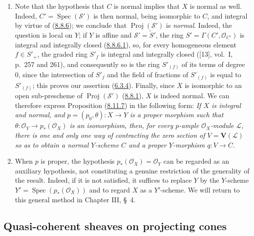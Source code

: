 \begin{remark}[8.11.8]
\label{II.8.11.8}
\begin{enumerate}
  \item[\rm{(i)}] Note that the hypothesis that $C$ is normal implies that
  $X$ is normal as well. Indeed, $C'=\operatorname{Spec}(\mathcal{S}')$ is
  then normal, being isomorphic to $C$, and integral by virtue of
  (\hyperref[II.8.8.6]{8.8.6}); we conclude that
  $\operatorname{Proj}(\mathcal{S}')$ is \emph{normal}. Indeed, the question
  is local on $Y$; if $Y$ is affine and $\mathcal{S}'=\widetilde{S}'$,
  the ring $S'=\Gamma(C',\mathcal{O}_{C'})$ is integral and integrally closed
  (\hyperref[II.8.8.6.1]{8.8.6.1}), so, for every homogeneous element
  $f\in S'_+$, the graded ring $S'_f$ is integral and integrally closed
  ([13], vol.~I, p.~257 and 261), and consequently so is the ring $S'_{(f)}$
  of its terms of degree 0, since the intersection of $S'_f$ and the field
  of fractions of $S'_{(f)}$ is equal to $S'_{(f)}$; this proves our
  assertion (\hyperref[II.6.3.4]{6.3.4}). Finally, since $X$ is isomorphic
  to an open sub-prescheme of $\operatorname{Proj}(\mathcal{S}')$
  (\hyperref[II.8.8.1]{8.8.1}), $X$ is indeed normal. We can therefore
  express Proposition (\hyperref[II.8.11.7]{8.11.7}) in the following form:
  \emph{If $X$ is integral and normal, and
  $p=(p_0,\theta):X\to Y$ is a proper morphism such that
  $\theta:\mathcal{O}_Y\to p_*(\mathcal{O}_X)$ is an isomorphism, then,
  for every $p$-ample $\mathcal{O}_X$-module $\mathcal{L}$, there is one
  and only one way of contracting the zero section of
  $V=\mathbf{V}(\mathcal{L})$ so as to obtain a normal $Y$-scheme $C$ and
  a proper $Y$-morphism $q:V\to C$.}
  \item[\rm{(ii)}] When $p$ is proper, the hypothesis
  $p_*(\mathcal{O}_X)=\mathcal{O}_Y$ can be regarded as an auxiliary
  hypothesis, not constituting a genuine restriction of the generality of the
  result. Indeed, if it is not satisfied, it suffices to replace $Y$
  by the $Y$-scheme
  $Y'=\operatorname{Spec}(p_*(\mathcal{O}_X))$ and to regard $X$ as a
  $Y'$-scheme. We will return to this general method in Chapter III,
  \S~4.
\end{enumerate}
\end{remark}


\subsection{Quasi-coherent sheaves on projecting cones}
\label{subsection:II.8.12}

